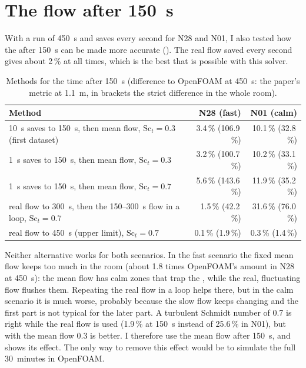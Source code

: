 \section{The flow after 150~s}
With a run of 450~s and saves every second for N28 and N01, I also tested how the \cotwo{} after 150~s can be
made more accurate (). The real flow saved every second gives about 2\,\% at all times,
which is the best that is possible with this solver.

\begin{table}[h]
  \centering
  \caption[Methods for the time after 150~s.]{Methods for the time after 150~s (difference to OpenFOAM
  at 450~s: the paper's metric at 1.1~m, in brackets the strict difference in the whole room).}
  \label{tab:after150}
  \small
  \begin{tabular}{>{\raggedright}p{8.2cm}rr}
    \toprule
    Method & N28 (fast) & N01 (calm)\\
    \midrule
    10~s saves to 150~s, then mean flow, $\mathrm{Sc}_t=0.3$ (first dataset) & 3.4\,\% (106.9\,\%) & 10.1\,\% (32.8\,\%)\\
    1~s saves to 150~s, then mean flow, $\mathrm{Sc}_t=0.3$ & 3.2\,\% (100.7\,\%) & 10.2\,\% (33.1\,\%)\\
    1~s saves to 150~s, then mean flow, $\mathrm{Sc}_t=0.7$ & 5.6\,\% (143.6\,\%) & 11.9\,\% (35.2\,\%)\\
    real flow to 300~s, then the 150--300~s flow in a loop, $\mathrm{Sc}_t=0.7$ & 1.5\,\% (42.2\,\%) & 31.6\,\% (76.0\,\%)\\
    real flow to 450~s (upper limit), $\mathrm{Sc}_t=0.7$ & 0.1\,\% (1.9\,\%) & 0.3\,\% (1.4\,\%)\\
    \bottomrule
  \end{tabular}
\end{table}

Neither alternative works for both scenarios. In the fast scenario the fixed mean flow keeps too much
\cotwo{} in the room (about 1.8 times OpenFOAM's amount in N28 at 450~s): the mean flow has calm zones that trap the
\cotwo{}, while the real, fluctuating flow flushes them. Repeating the real flow in a loop helps there, but in
the calm scenario it is much worse, probably because the slow flow keeps changing and the first part is not
typical for the later part. A turbulent Schmidt number of 0.7 is right while the real flow is used
(1.9\,\% at 150~s instead of 25.6\,\% in N01), but with the mean flow 0.3 is better. I therefore use the mean
flow after 150~s, and  shows its effect. The only way to remove this effect would be to
simulate the full 30~minutes in OpenFOAM.

